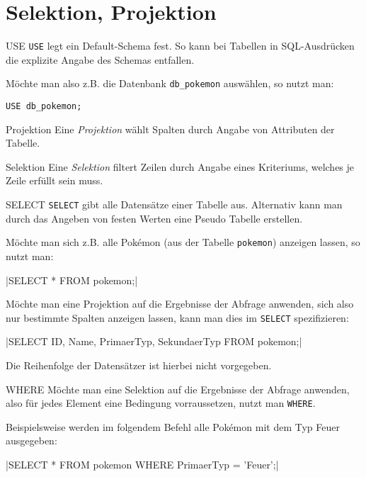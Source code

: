 \section{Selektion, Projektion}

\begin{code}{USE}
    \texttt{USE} legt ein Default-Schema fest.
    So kann bei Tabellen in SQL-Ausdrücken die explizite Angabe des Schemas entfallen.

    Möchte man also z.B. die Datenbank \texttt{db\_pokemon} auswählen, so nutzt man:

    \begin{verbatim}
USE db_pokemon;
    \end{verbatim}
\end{code}

\begin{defi}{Projektion}
    Eine \emph{Projektion} wählt Spalten durch Angabe von Attributen der Tabelle.
\end{defi}

\begin{defi}{Selektion}
    Eine \emph{Selektion} filtert Zeilen durch Angabe eines Kriteriums, welches je Zeile erfüllt sein muss.
\end{defi}

\begin{code}{SELECT}
    \texttt{SELECT} gibt alle Datensätze einer Tabelle aus.
    Alternativ kann man durch das Angeben von festen Werten eine Pseudo Tabelle erstellen.

    Möchte man sich z.B. alle Pokémon (aus der Tabelle \texttt{pokemon}) anzeigen lassen, so nutzt man:

    |SELECT * FROM pokemon;|

    

    Möchte man eine Projektion auf die Ergebnisse der Abfrage anwenden, sich also nur bestimmte Spalten anzeigen lassen, kann man dies im \texttt{SELECT} spezifizieren:

    |SELECT ID, Name, PrimaerTyp, SekundaerTyp FROM pokemon;|

    

    Die Reihenfolge der Datensätzer ist hierbei nicht vorgegeben.
\end{code}

\begin{code}{WHERE}
    Möchte man eine Selektion auf die Ergebnisse der Abfrage anwenden, also für jedes Element eine Bedingung vorraussetzen, nutzt man \texttt{WHERE}.

    Beispielsweise werden im folgendem Befehl alle Pokémon mit dem Typ Feuer ausgegeben:

    |SELECT * FROM pokemon WHERE PrimaerTyp = 'Feuer';|

    
\end{code}

